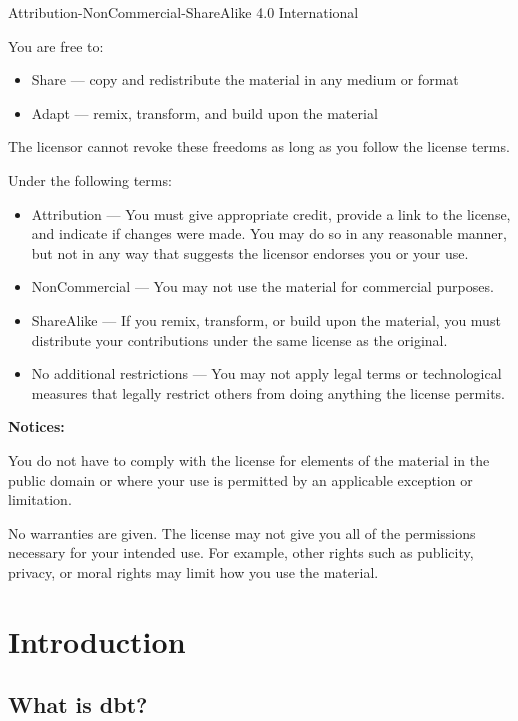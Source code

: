 \documentclass[
]{book}
\begin{document}
Attribution-NonCommercial-ShareAlike 4.0 International

You are free to:

\begin{itemize}
\item
  Share --- copy and redistribute the material in any medium or format
\item
  Adapt --- remix, transform, and build upon the material
\end{itemize}

The licensor cannot revoke these freedoms as long as you follow the license terms.

Under the following terms:

\begin{itemize}
\item
  Attribution --- You must give appropriate credit, provide a link to the license, and indicate if changes were made. You may do so in any reasonable manner, but not in any way that suggests the licensor endorses you or your use.
\item
  NonCommercial --- You may not use the material for commercial purposes.
\item
  ShareAlike --- If you remix, transform, or build upon the material, you must distribute your contributions under the same license as the original.
\item
  No additional restrictions --- You may not apply legal terms or technological measures that legally restrict others from doing anything the license permits.
\end{itemize}

\textbf{Notices:}

You do not have to comply with the license for elements of the material in the public domain or where your use is permitted by an applicable exception or limitation.

No warranties are given. The license may not give you all of the permissions necessary for your intended use. For example, other rights such as publicity, privacy, or moral rights may limit how you use the material.

\hypertarget{introduction}{%
\chapter{Introduction}\label{introduction}}

\hypertarget{what-is-dbt}{%
\section{What is dbt?}\label{what-is-dbt}}
\end{document}
